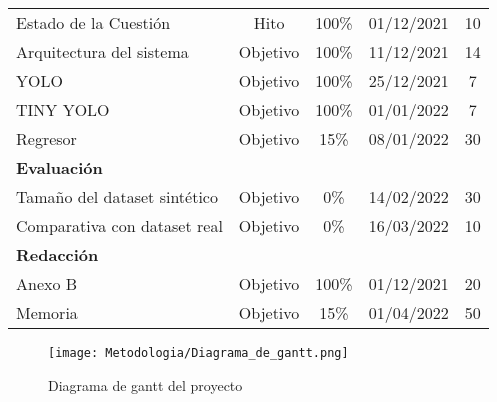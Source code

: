 \begin{table}[htbp]
\begin{tabular}{p{16.5em}cccc}
    \rowcolor[rgb]{ .949,  .949,  .949} Estado de la Cuestión & Hito  & 100\% & 01/12/2021 & 10  \\
    Arquitectura del sistema & Objetivo & 100\% & 11/12/2021 & 14  \\
    \rowcolor[rgb]{ .949,  .949,  .949} YOLO & Objetivo & 100\% & 25/12/2021 & 7  \\
    TINY YOLO & Objetivo & 100\% & 01/01/2022 & 7  \\
    \rowcolor[rgb]{ .949,  .949,  .949} Regresor & Objetivo & 15\% & 08/01/2022 & 30  \\
    \textbf{Evaluación} &       &       &       &  \\
    \rowcolor[rgb]{ .949,  .949,  .949} Tamaño del dataset sintético & Objetivo & 0\% & 14/02/2022 & 30  \\
    Comparativa con dataset real & Objetivo & 0\% & 16/03/2022 & 10  \\
    \rowcolor[rgb]{ .949,  .949,  .949} \textbf{Redacción} &       &       &       &  \\
    Anexo B & Objetivo & 100\% & 01/12/2021 & 20  \\
    \rowcolor[rgb]{ .949,  .949,  .949} Memoria & Objetivo & 15\% & 01/04/2022 & 50  \\
    \end{tabular}%
  \label{chap:Metodología tab:plan}%
\end{table}%

\begin{figure}[ht]
	\centering
	\texttt{[image: Metodologia/Diagrama\_de\_gantt.png]}
	\caption{Diagrama de gantt del proyecto}
	\label{chap:Metodología fig:Gantt}
	\vspace{-5pt}
\end{figure}